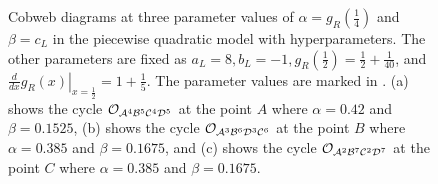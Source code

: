 \begin{figure}
	\centering
	\caption[Cobweb diagrams of the first piecewise quadratic model with composite parameters]{
	Cobweb diagrams at three parameter values of $\alpha = g_R\left(\frac{1}{4}\right)$ and $\beta = c_L$ in the piecewise quadratic model with hyperparameters.
	The other parameters are fixed as $a_L = 8, b_L = -1, g_R\left(\frac{1}{2}\right) = \frac{1}{2} + \frac{1}{40}$, and $\left. \frac{d}{dx} g_R(x) \right|_{x = \frac{1}{2}} = 1 + \frac{1}{5}$.
	The parameter values are marked in .
	(a) shows the cycle $\mathcal{O}_{\mathcal{A}^4\mathcal{B}^5\mathcal{C}^4\mathcal{D}^5}$ at the point $A$ where $\alpha = 0.42$ and $\beta = 0.1525$,
	(b) shows the cycle $\mathcal{O}_{\mathcal{A}^3\mathcal{B}^6\mathcal{D}^3\mathcal{C}^6}$ at the point $B$ where $\alpha = 0.385$ and $\beta = 0.1675$,
	and (c) shows the cycle $\mathcal{O}_{\mathcal{A}^2\mathcal{B}^7\mathcal{C}^2\mathcal{D}^7}$ at the point $C$ where $\alpha = 0.385$ and $\beta = 0.1675$.
	}
	\label{fig:setup.quad.hyper.1.cobwebs}
\end{figure}

